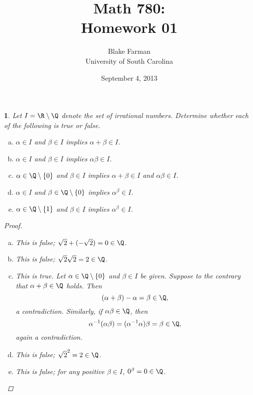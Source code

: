 \documentclass[10pt]{amsart}
\author{Blake Farman\\University of South Carolina}
\title{Math 780:\\Homework 01}
\date{September 4, 2013}
\begin{document}
\maketitle

\providecommand{\p}{\mathfrak{p}}
\providecommand{\m}{\mathfrak{m}}

\newtheorem{thm}{}
\newtheorem{lem}{Lemma}

\begin{thm}\label{ex1}
  Let $I = \R \setminus \Q$ denote the set of irrational numbers.
  Determine whether each of the following is true or false.

  \begin{enumerate}[(a)]
  \item
    $\alpha \in I$ and $\beta \in I$ implies $\alpha + \beta \in I$.
  \item
    $\alpha \in I$ and $\beta \in I$ implies $\alpha\beta \in I$.
  \item
    $\alpha \in \Q \setminus \left\{ 0 \right\}$ and $\beta \in I$ implies $\alpha + \beta \in I$ and $\alpha\beta \in I$.
  \item
    $\alpha \in I$ and $\beta \in \Q \setminus \left\{0 \right\}$ implies $\alpha^\beta \in I$.
  \item
    $\alpha \in \Q \setminus \{1\}$ and $\beta \in I$ implies $\alpha^\beta \in I$.
  \end{enumerate}
  
  \begin{proof}
    \begin{enumerate}[(a)]
    \item
      This is false; $\sqrt{2} + (- \sqrt{2}) = 0 \in \Q$.
    \item
      This is false; $\sqrt{2}\sqrt{2} = 2 \in \Q$.
    \item
      This is true.
      Let $\alpha \in \Q \setminus \left\{ 0 \right\}$ and $\beta \in I$ be given.
      Suppose to the contrary that $\alpha + \beta \in \Q$ holds.
      Then
      $$(\alpha + \beta) - \alpha = \beta \in \Q,$$
      a contradiction.
      Similarly, if $\alpha\beta \in \Q$, then
      $$\alpha^{-1}(\alpha\beta) = (\alpha^{-1}\alpha)\beta = \beta \in \Q,$$ 
      again a contradiction.
    \item
      This is false; $\sqrt{2}^2 = 2 \in \Q$.
    \item
      This is false; for any positive $\beta \in I$, $0^\beta = 0 \in \Q$.
    \end{enumerate}
  \end{proof}
\end{thm}
\end{document}
